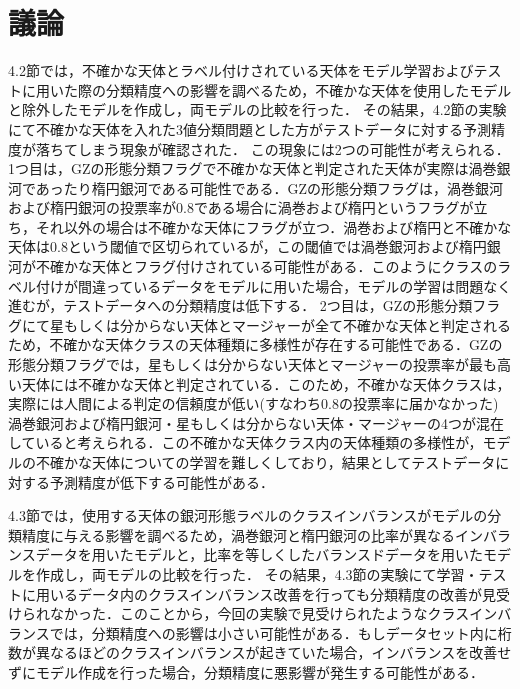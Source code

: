 \documentclass[a4j, 11pt]{jreport}
\begin{document}
\section{議論}
4.2節では，不確かな天体とラベル付けされている天体をモデル学習およびテストに用いた際の分類精度への影響を調べるため，不確かな天体を使用したモデルと除外したモデルを作成し，両モデルの比較を行った．
その結果，4.2節の実験にて不確かな天体を入れた3値分類問題とした方がテストデータに対する予測精度が落ちてしまう現象が確認された．
この現象には2つの可能性が考えられる．1つ目は，GZの形態分類フラグで不確かな天体と判定された天体が実際は渦巻銀河であったり楕円銀河である可能性である．GZの形態分類フラグは，渦巻銀河および楕円銀河の投票率が0.8である場合に渦巻および楕円というフラグが立ち，それ以外の場合は不確かな天体にフラグが立つ．渦巻および楕円と不確かな天体は0.8という閾値で区切られているが，この閾値では渦巻銀河および楕円銀河が不確かな天体とフラグ付けされている可能性がある．このようにクラスのラベル付けが間違っているデータをモデルに用いた場合，モデルの学習は問題なく進むが，テストデータへの分類精度は低下する．
2つ目は，GZの形態分類フラグにて星もしくは分からない天体とマージャーが全て不確かな天体と判定されるため，不確かな天体クラスの天体種類に多様性が存在する可能性である．GZの形態分類フラグでは，星もしくは分からない天体とマージャーの投票率が最も高い天体には不確かな天体と判定されている．このため，不確かな天体クラスは，実際には人間による判定の信頼度が低い(すなわち0.8の投票率に届かなかった)渦巻銀河および楕円銀河・星もしくは分からない天体・マージャーの4つが混在していると考えられる．この不確かな天体クラス内の天体種類の多様性が，モデルの不確かな天体についての学習を難しくしており，結果としてテストデータに対する予測精度が低下する可能性がある．


4.3節では，使用する天体の銀河形態ラベルのクラスインバランスがモデルの分類精度に与える影響を調べるため，渦巻銀河と楕円銀河の比率が異なるインバランスデータを用いたモデルと，比率を等しくしたバランスドデータを用いたモデルを作成し，両モデルの比較を行った．
その結果，4.3節の実験にて学習・テストに用いるデータ内のクラスインバランス改善を行っても分類精度の改善が見受けられなかった．このことから，今回の実験で見受けられたようなクラスインバランスでは，分類精度への影響は小さい可能性がある．もしデータセット内に桁数が異なるほどのクラスインバランスが起きていた場合，インバランスを改善せずにモデル作成を行った場合，分類精度に悪影響が発生する可能性がある．
\end{document}
